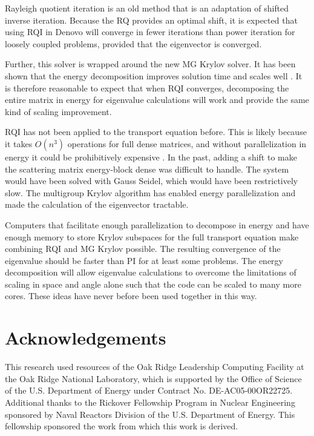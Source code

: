 \documentclass[preprint,12pt]{elsarticle}
\begin{document}
Rayleigh quotient iteration is an old method that is an adaptation of shifted inverse iteration. Because the RQ provides an optimal shift, it is expected that using RQI in Denovo will converge in fewer iterations than power iteration for loosely coupled problems, provided that the eigenvector is converged. 

Further, this solver is wrapped around the new MG Krylov solver. It has been shown that the energy decomposition improves solution time and scales well \cite{Slaybaugh2011}. It is therefore reasonable to expect that when RQI converges, decomposing the entire matrix in energy for eigenvalue calculations will work and provide the same kind of scaling improvement.

RQI has not been applied to the transport equation before. This is likely because it takes $O(n^{3})$ operations for full dense matrices, and without parallelization in energy it could be prohibitively expensive \cite{Stewart2001}. In the past, adding a shift to make the scattering matrix energy-block dense was difficult to handle. The system would have been solved with Gauss Seidel, which would have been restrictively slow. The multigroup Krylov algorithm has enabled energy parallelization and made the calculation of the eigenvector tractable. 

Computers that facilitate enough parallelization to decompose in energy and have enough memory to store Krylov subspaces for the full transport equation make combining RQI and MG Krylov possible. The resulting convergence of the eigenvalue should be faster than PI for at least some problems. The energy decomposition will allow eigenvalue calculations to overcome the limitations of scaling in space and angle alone such that the code can be scaled to many more cores. These ideas have never before been used together in this way.  



\section{Acknowledgements}

This research used resources of the Oak Ridge Leadership Computing Facility at the Oak Ridge National Laboratory, which is supported by the Office of Science of the U.S. Department of Energy under Contract No. DE-AC05-00OR22725. Additional thanks to the Rickover Fellowship Program in Nuclear Engineering sponsored by Naval Reactors Division of the U.S. Department of Energy. This fellowship sponsored the work from which this work is derived. 
\end{document}
